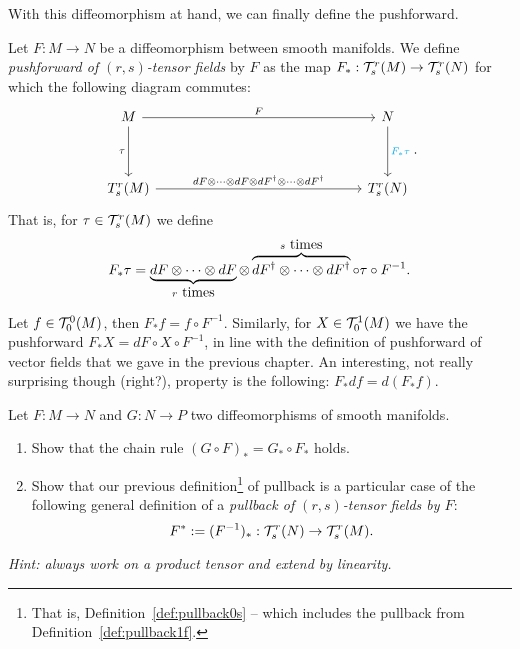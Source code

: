 With this diffeomorphism at hand, we can finally define the pushforward.

\begin{definition}
  Let $F:M\to N$ be a diffeomorphism between smooth manifolds.
  We define \emph{pushforward of $(r,s)$-tensor fields} by $F$ as the map $F_*: \mathcal{T}_s^r(M) \to \mathcal{T}_s^r(N)$ for which the following diagram commutes:
  \begin{equation}
    \begin{tikzcd}[row sep=huge, column sep=huge]
      M \arrow[r, "F"] \arrow[d, "\tau" left]
      &[10em] N \arrow[d, "F_* \tau" cyan] \\
      T_s^r(M) \arrow[r, "dF \otimes\cdots\otimes dF \otimes dF^\dagger \otimes\cdots\otimes dF^\dagger "]
      & T_s^r(N)
    \end{tikzcd}.
  \end{equation}
  That is, for $\tau\in\mathcal{T}_s^r(M)$ we define
  \begin{equation}
    F_*\tau = \LaTeXunderbrace{dF \otimes\cdots\otimes dF}_{r\mbox{ times}} \otimes \LaTeXoverbrace{dF^\dagger \otimes\cdots\otimes dF^\dagger }^{s\mbox{ times}} \circ \tau \circ F^{-1}.
  \end{equation}
\end{definition}

\begin{example}
  Let $f\in\mathcal{T}_0^0(M)$, then $F_* f = f\circ F^{-1}$.
  Similarly, for $X\in\mathcal{T}_0^1(M)$ we have the pushforward $F_* X = dF\circ X \circ F^{-1}$, in line with the definition of pushforward of vector fields that we gave in the previous chapter.
  An interesting, not really surprising though (right?), property is the following: $F_* df = d(F_* f)$.
\end{example}

\begin{exercise}[\textit{[homework 3]}]
  Let $F:M\to N$ and $G:N\to P$ two diffeomorphisms of smooth manifolds.
  \begin{enumerate}
    \item Show that the chain rule $(G\circ F)_* = G_* \circ F_*$ holds.
    \item Show that our previous definition\footnote{That is, Definition~\ref{def:pullback0s} -- which includes the pullback from Definition~\ref{def:pullback1f}.} of pullback is a particular case of the following general definition of a \emph{pullback of $(r,s)$-tensor fields by $F$}:
    \begin{equation}
      F^* := (F^{-1})_* : \mathcal{T}_s^r(N) \to \mathcal{T}_s^r(M).
    \end{equation}
  \end{enumerate}
  \textit{\small Hint: always work on a product tensor and extend by linearity.}
\end{exercise}

